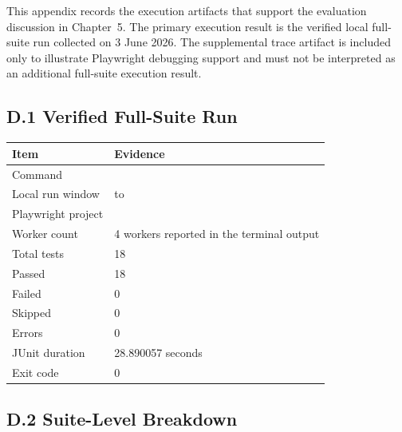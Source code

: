 \label{app:sample-reports}
\begingroup
\sloppy
\setlength{\emergencystretch}{3em}

This appendix records the execution artifacts that support the evaluation discussion in Chapter~5. The primary execution result is the verified local full-suite run collected on 3 June 2026. The supplemental trace artifact is included only to illustrate Playwright debugging support and must not be interpreted as an additional full-suite execution result.

\subsection*{D.1 Verified Full-Suite Run}

\begin{center}
\tablefont
\begin{tabularx}{0.78\textwidth}{>{\RaggedRight\arraybackslash}p{}Y}
\toprule
Item & Evidence \\
\midrule
Command &  \\
Local run window &  to  \\
Playwright project &  \\
Worker count & 4 workers reported in the terminal output \\
Total tests & 18 \\
Passed & 18 \\
Failed & 0 \\
Skipped & 0 \\
Errors & 0 \\
JUnit duration & 28.890057 seconds \\
Exit code & 0 \\
\bottomrule
\end{tabularx}
\end{center}

\subsection*{D.2 Suite-Level Breakdown}


